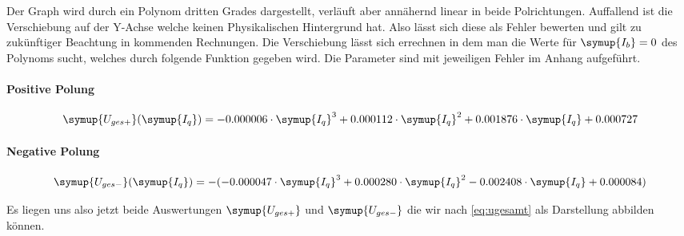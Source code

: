 Der Graph wird durch ein Polynom dritten Grades dargestellt, verläuft aber annähernd linear in beide Polrichtungen. Auffallend ist die Verschiebung auf der Y-Achse %
welche keinen Physikalischen Hintergrund hat. Also lässt sich diese als Fehler bewerten und gilt zu zukünftiger Beachtung in kommenden Rechnungen.
Die Verschiebung lässt sich errechnen in dem man die Werte für $\symup{I_b}=0$ des Polynoms sucht, welches durch folgende Funktion gegeben wird.  
Die Parameter sind mit jeweiligen Fehler im Anhang aufgeführt.  

\paragraph{Positive Polung}
\begin{equation}
   \symup{U_{ges+}}(\symup{I_q})=-0.000006 \cdot \symup{I_q}^3 + 0.000112\cdot\symup{I_q}^2 + 0.001876 \cdot\symup{I_q} + 0.000727 
\end{equation}

\paragraph{Negative Polung} 
\begin{equation}
   \symup{U_{ges-}}(\symup{I_q})=-(-0.000047 \cdot \symup{I_q}^3 + 0.000280\cdot\symup{I_q}^2 -0.002408\cdot\symup{I_q} + 0.000084)
\end{equation}

%
%

Es liegen uns also jetzt beide Auswertungen $\symup{U_{ges+}}$ und $\symup{U_{ges-}}$ die wir nach \eqref{eq:ugesamt} als Darstellung abbilden können.



